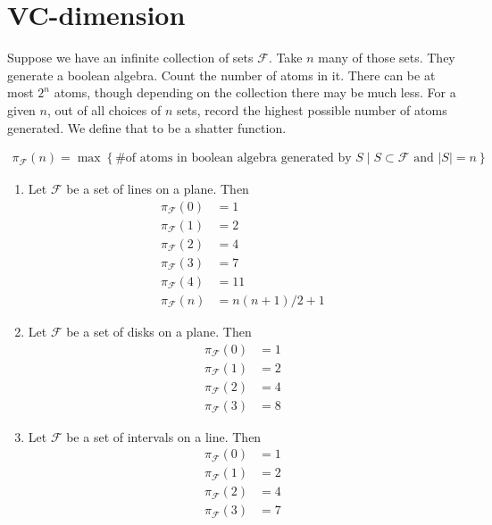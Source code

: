 \documentclass{amsart}
\newcommand{\F}{\mathcal F}
\newcommand{\curly}[1]{\left\{ #1 \right\}}
\begin{document}
\section{VC-dimension}

Suppose we have an infinite collection of sets $\F$.
Take $n$ many of those sets.
They generate a boolean algebra.
Count the number of atoms in it.
There can be at most $2^n$ atoms, though depending on the collection there may be much less.
For a given $n$, out of all choices of $n$ sets, record the highest possible number of atoms generated.
We define that to be a shatter function.

\begin{Definition}
	\begin{align*}
		\pi_\F(n) = \max \curly{ \text {\# of atoms in boolean algebra generated by $S$} \mid S \subset \F \text{ and } |S| = n}
	\end{align*}
\end{Definition}

\begin{Example}
	\begin{enumerate}
		\item Let $\F$ be a set of lines on a plane. Then
		\begin{align*}
			\pi_\F(0) &= 1 \\
			\pi_\F(1) &= 2 \\
			\pi_\F(2) &= 4 \\
			\pi_\F(3) &= 7 \\
			\pi_\F(4) &= 11 \\
			\pi_\F(n) &= n(n+1)/2 + 1
		\end{align*}
		\item Let $\F$ be a set of disks on a plane. Then
		\begin{align*}
			\pi_\F(0) &= 1 \\
			\pi_\F(1) &= 2 \\
			\pi_\F(2) &= 4 \\
			\pi_\F(3) &= 8
		\end{align*}
		\item Let $\F$ be a set of intervals on a line. Then
		\begin{align*}
			\pi_\F(0) &= 1 \\
			\pi_\F(1) &= 2 \\
			\pi_\F(2) &= 4 \\
			\pi_\F(3) &= 7
		\end{align*}
	\end{enumerate}
\end{Example}
\end{document}
